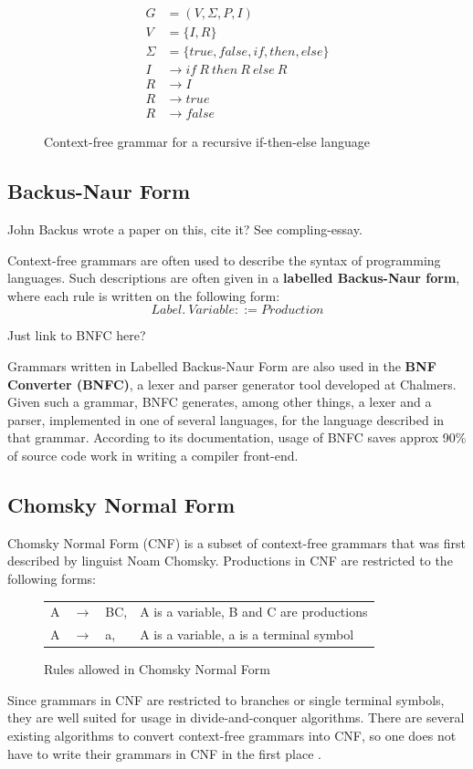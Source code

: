 \documentclass[a4paper,12pt,twosided]{report}
\begin{document}
\begin{figure}[H]
\begin{align*}
G &= (V, \Sigma , P, I) \\
V &= \{I,R\} \\
\Sigma &= \{true,false,if,then,else\} \\
I &\rightarrow if\ R\ then\ R\ else\ R \\
R &\rightarrow I \\
R &\rightarrow true \\
R &\rightarrow false
\end{align*}
\caption{Context-free grammar for a recursive if-then-else language}
\label{iflang}
\end{figure}

\subsection{Backus-Naur Form}
John Backus wrote a paper on this, cite it? See compling-essay.

Context-free grammars are often used to describe the syntax of programming
languages. Such descriptions are often given in a \textbf{labelled Backus-Naur
form}, where each rule is written on the following form:
\[
Label.\ Variable ::= Production 
\]

Just link to BNFC here?

Grammars written in Labelled Backus-Naur Form are also used in the \textbf{BNF
Converter (BNFC)}, a lexer and parser generator tool developed at Chalmers.
Given such a grammar, BNFC generates, among other things, a lexer and a parser,
implemented in one of several languages, for the language described in that
grammar. According to its documentation, usage of BNFC saves approx 90\% of
source code work in writing a compiler front-end. 

\subsection{Chomsky Normal Form}
Chomsky Normal Form (CNF) is a subset of context-free grammars that was first
described by linguist Noam Chomsky. Productions in CNF are restricted to the
following forms:

\begin{figure}[H]
\begin{tabular}{l l l l}
    A & $\rightarrow$ & BC, & A is a variable, B and C are productions \\
    A & $\rightarrow$ & a, & A is a variable, a is a terminal symbol \\
\end{tabular}
\caption{Rules allowed in Chomsky Normal Form}
\end{figure}
Since grammars in CNF are restricted to branches or single terminal symbols,
they are well suited for usage in divide-and-conquer algorithms. There are
several existing algorithms to convert context-free grammars into CNF, so one
does not have to write their grammars in CNF in the first place \cite{langeleiss}.
\end{document}
